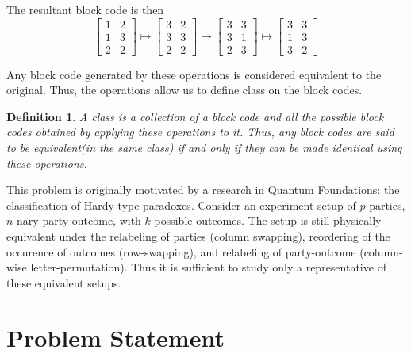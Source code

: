 \documentclass[12pt]{article}  %
\newtheorem{definition}{Definition}
\begin{document}
The resultant block code is then 
$$\left[\begin{array}{cc}1 & 2\\ 1 & 3\\ 2 & 2\end{array}\right]
\mapsto
\left[\begin{array}{cc}3 & 2\\ 3 & 3\\ 2 & 2\end{array}\right]
\mapsto
\left[\begin{array}{cc}3 & 3\\ 3 & 1\\ 2 & 3\end{array}\right]
\mapsto
\left[\begin{array}{cc}3 & 3\\ 1 & 3\\ 3 & 2\end{array}\right]$$

Any block code generated by these operations is considered equivalent to the original. Thus, the operations allow us to define class on the block codes.


\begin{definition}
A class is a collection of a block code and all the possible block codes obtained by applying these operations to it. Thus, any block codes are said to be equivalent(in the same class) if and only if they can be made identical using these operations.
\end{definition}


 This problem is originally motivated by a research in Quantum Foundations: the classification of Hardy-type paradoxes. Consider an experiment setup of $p$-parties, $n$-nary party-outcome, with $k$ possible outcomes. The setup is still physically equivalent under the relabeling of parties (column swapping), reordering of the occurence of outcomes (row-swapping), and relabeling of party-outcome (column-wise letter-permutation). Thus it is sufficient to study only a representative of these equivalent setups.
















\section{Problem Statement}
\end{document}
